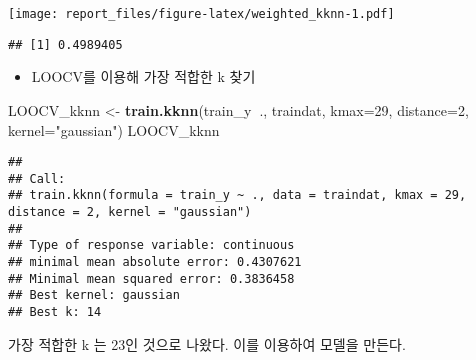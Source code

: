 \documentclass[]{article}
\newenvironment{Shaded}{\begin{snugshade}}{\end{snugshade}}
\newcommand{\DataTypeTok}[1]{\textcolor[rgb]{0.13,0.29,0.53}{#1}}
\newcommand{\DecValTok}[1]{\textcolor[rgb]{0.00,0.00,0.81}{#1}}
\newcommand{\KeywordTok}[1]{\textcolor[rgb]{0.13,0.29,0.53}{\textbf{#1}}}
\newcommand{\NormalTok}[1]{#1}
\newcommand{\OperatorTok}[1]{\textcolor[rgb]{0.81,0.36,0.00}{\textbf{#1}}}
\newcommand{\StringTok}[1]{\textcolor[rgb]{0.31,0.60,0.02}{#1}}
\providecommand{\tightlist}{%
  \setlength{\itemsep}{0pt}\setlength{\parskip}{0pt}}
\begin{document}
\begin{Shaded}
\end{Shaded}

\texttt{[image: report\_files/figure-latex/weighted\_kknn-1.pdf]}

\begin{Shaded}
\end{Shaded}

\begin{verbatim}
## [1] 0.4989405
\end{verbatim}

\begin{itemize}
\tightlist
\item
  LOOCV를 이용해 가장 적합한 k 찾기
\end{itemize}

\begin{Shaded}
\begin{Highlighting}[]
\NormalTok{LOOCV_kknn <-}\StringTok{ }\KeywordTok{train.kknn}\NormalTok{(train_y}\OperatorTok{~}\NormalTok{., traindat, }\DataTypeTok{kmax=}\DecValTok{29}\NormalTok{, }\DataTypeTok{distance=}\DecValTok{2}\NormalTok{, }\DataTypeTok{kernel=}\StringTok{"gaussian"}\NormalTok{)}
\NormalTok{LOOCV_kknn}
\end{Highlighting}
\end{Shaded}

\begin{verbatim}
## 
## Call:
## train.kknn(formula = train_y ~ ., data = traindat, kmax = 29,     distance = 2, kernel = "gaussian")
## 
## Type of response variable: continuous
## minimal mean absolute error: 0.4307621
## Minimal mean squared error: 0.3836458
## Best kernel: gaussian
## Best k: 14
\end{verbatim}

가장 적합한 k 는 23인 것으로 나왔다. 이를 이용하여 모델을 만든다.
\end{document}
